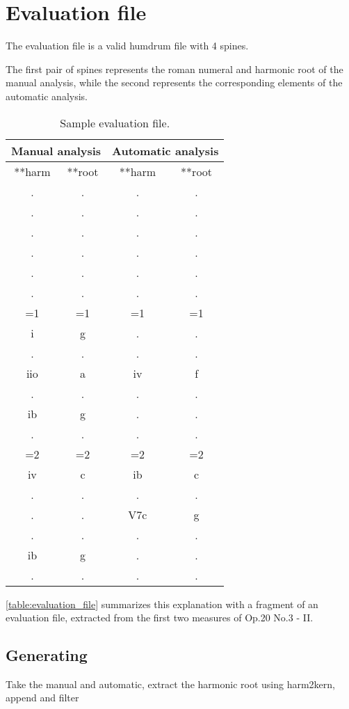 \section{Evaluation file}
	The evaluation file is a valid humdrum file with 4 spines.

	The first pair of spines represents the roman numeral and harmonic root of the manual analysis, while the second represents the corresponding elements of the automatic analysis.

	\begin{table}[tbp]
	\centering
	\begin{tabular}{|cc|cc|}
	\hline
	\multicolumn{2}{|c|}{Manual analysis} & \multicolumn{2}{c|}{Automatic analysis} \\ \hline
	**harm & **root & **harm & **root \\
	. & . & . & . \\
	. & . & . & . \\
	. & . & . & . \\
	. & . & . & . \\
	. & . & . & . \\
	. & . & . & . \\
	=1 & =1 & =1 & =1 \\
	i & g & . & . \\
	. & . & . & . \\
	iio & a & iv & f \\
	. & . & . & . \\
	ib & g & . & . \\
	. & . & . & . \\
	=2 & =2 & =2 & =2 \\
	iv & c & ib & c \\
	. & . & . & . \\
	. & . & V7c & g \\
	. & . & . & . \\
	ib & g & . & . \\
	. & . & . & . \\ \hline
	\end{tabular}
	\caption{Sample evaluation file.}
	\label{table:evaluation_file}
	\end{table}

	\autoref{table:evaluation_file} summarizes this explanation with a fragment of an evaluation file, extracted from the first two measures of Op.20 No.3 - II.

  \subsection{Generating}
  Take the manual and automatic, extract the harmonic root using harm2kern, append and filter
